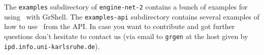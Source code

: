 The \texttt{examples} subdirectory of \texttt{engine-net-2} contains a bunch of examples for using \GrG~with GrShell.
The \texttt{examples-api} subdirectory contains several examples of how to use \GrG~from the API.
In case you want to contribute and got further questions don't hesitate to contact us 
(via email to \texttt{grgen} at the host given by \texttt{ipd.info.uni-karlsruhe.de}).



